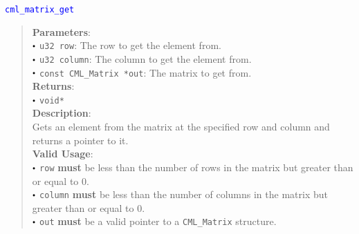 \documentclass[a4paper,oneside,8pt]{extarticle}
\newcommand{\function}[1]{
  \noindent\textcolor{blue}{\texttt{#1}}
  \vspace{-0.3em}
}
\renewcommand{\dot}{\raisebox{0.3ex}{\scalebox{0.6}{$\bullet$}}}
\theoremstyle{definition}
\begin{document}
\function{cml\_matrix\_get}
\begin{quote}
  \textbf{Parameters}: \\
  $\dot$ \texttt{u32 row}: The row to get the element from. \\
  $\dot$ \texttt{u32 column}: The column to get the element from. \\
  $\dot$ \texttt{const CML\_Matrix *out}: The matrix to get from. \\
  \textbf{Returns}: \\
  $\dot$ \texttt{void*} \\

  \vspace{-0.75em}
  \textbf{Description}: \\
  Gets an element from the matrix at the specified row and column and returns a pointer to it. \\

  \vspace{-0.75em}
  \textbf{Valid Usage}: \\
  $\dot$ \texttt{row} \textbf{must} be less than the number of rows in the matrix but greater than or equal to 0. \\
  $\dot$ \texttt{column} \textbf{must} be less than the number of columns in the matrix but greater than or equal to 0. \\
  $\dot$ \texttt{out} \textbf{must} be a valid pointer to a \texttt{CML\_Matrix} structure. \\
\end{quote}
\end{document}
